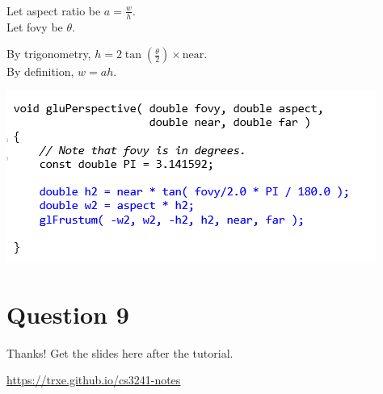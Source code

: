 \documentclass{beamer}
\begin{document}
\begin{frame}
    \frametitle{}
    Let aspect ratio be $a = \frac{w}{h}$.\\
    Let fovy be $\theta$.\\

    \vspace{1em}

    By trigonometry, $h = 2\tan(\frac{\theta}{2}) \times \text{near}$.\\
    By definition, $w = ah$.

    \vspace{1em}

    \begin{center}
        \includegraphics[scale=0.8]{q8-ans.png}
    \end{center}

\end{frame}

\section{Question 9}

\begin{frame}
    Thanks! Get the slides here after the tutorial.\\
    \vspace{2em}
    \scalebox{3}{\faGithub}\par\bigskip
    \url{https://trxe.github.io/cs3241-notes}
\end{frame}
\end{document}

